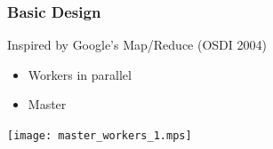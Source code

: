 \documentclass[xcolor=dvipsnames,8pt]{beamer}
\begin{document}

\begin{frame}\frametitle {Basic Design}

Inspired by Google's Map/Reduce (OSDI 2004)

\begin{itemize}
\item Workers in parallel
\item Master
\end{itemize}

\begin{center}
  \texttt{[image: master\_workers\_1.mps]}  
\end{center}
\end{frame}

\end{document}
